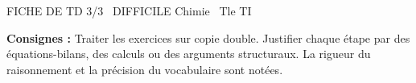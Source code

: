 \documentclass[11pt]{article}
\begin{document}
\begin{tcolorbox}[enhanced,colback=popink,colframe=popink,arc=10pt,boxrule=0pt,left=12pt,right=12pt,top=9pt,bottom=9pt]
{\color{white}\popxbold\small FICHE DE TD 3/3 \textbullet\ DIFFICILE \hfill Chimie \textbullet\ Tle TI\par}
\end{tcolorbox}
\vspace{4pt}
\noindent \textbf{Consignes :} Traiter les exercices sur copie double. Justifier chaque étape par des équations-bilans, des calculs ou des arguments structuraux. La rigueur du raisonnement et la précision du vocabulaire sont notées.
\end{document}
